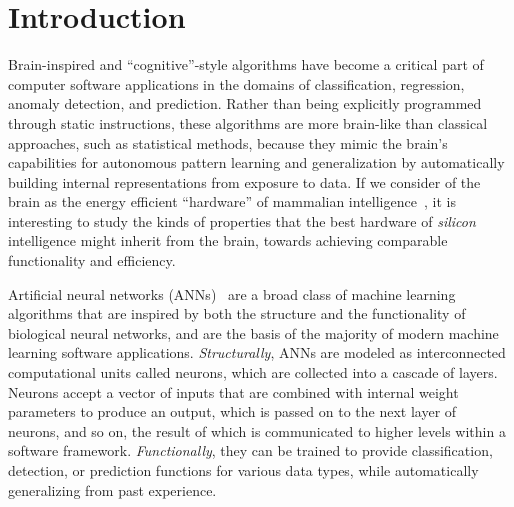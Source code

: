 \section{Introduction}

Brain-inspired and ``cognitive''-style algorithms have become a critical part of computer software applications in the domains of classification, regression, anomaly detection, and prediction.
Rather than being explicitly programmed through static instructions, these algorithms are more brain-like than classical approaches, such as statistical methods, because they mimic the brain's capabilities for autonomous pattern learning and generalization by automatically building internal representations from exposure to data.
If we consider of the brain as the energy efficient ``hardware'' of mammalian intelligence~\cite{laughlin2003communication}, it is interesting to study the kinds of properties that the best hardware of \textit{silicon} intelligence might inherit from the brain, towards achieving comparable functionality and efficiency.

Artificial neural networks (ANNs)~\cite{mcculloch1943logical, hebb2005organization, farley1954simulation, rochester1956tests} are a broad class of machine learning algorithms that are inspired by both the structure and the functionality of biological neural networks, and are the basis of the majority of modern machine learning software applications.
\textit{Structurally}, ANNs are modeled as interconnected computational units called neurons, which are collected into a cascade of layers.
Neurons accept a vector of inputs that are combined with internal weight parameters to produce an output, which is passed on to the next layer of neurons, and so on, the result of which is communicated to higher levels within a software framework.
\textit{Functionally}, they can be trained to provide classification, detection, or prediction functions for various data types, while automatically generalizing from past experience.

